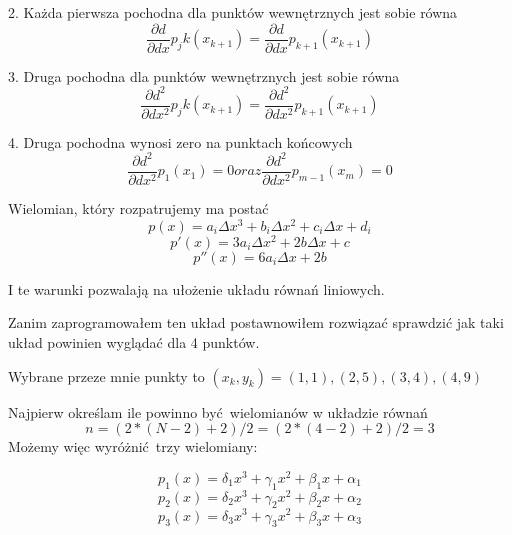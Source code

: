 \documentclass[varwidth,12pt,a4paper]{article}
\begin{document}
2. Każda pierwsza pochodna dla punktów wewnętrznych jest sobie równa
\begin{equation}
     \frac{\partial d}{\partial dx} p_jk (x_{k+1}) = \frac{\partial d}{\partial dx} p_{k+1} (x_{k+1})
\end{equation}

3. Druga pochodna dla punktów wewnętrznych jest sobie równa
\begin{equation}
     \frac{\partial d^2}{\partial dx^2} p_jk (x_{k+1}) = \frac{\partial d^2}{\partial dx^2} p_{k+1} (x_{k+1})
\end{equation}

4. Druga pochodna wynosi zero na punktach końcowych
\begin{equation}
     \frac{\partial d^2}{\partial dx^2} p_1 (x_{1}) = 0 oraz \frac{\partial d^2}{\partial dx^2} p_{m-1} (x_{m}) = 0
\end{equation}

Wielomian, który rozpatrujemy ma postać
\begin{equation}
    p(x) = a_i \Delta x^3 + b_i \Delta x^2 + c_i \Delta x + d_i
\end{equation}
\begin{equation}
    p'(x) = 3 a_i \Delta x^2 + 2b \Delta x + c
\end{equation}
\begin{equation}
    p''(x) = 6 a_i \Delta x + 2b
\end{equation}

I te warunki pozwalają na ułożenie układu równań liniowych.

Zanim zaprogramowałem ten układ postawnowiłem rozwiązać sprawdzić jak taki układ powinien wyglądać dla 4 punktów.

Wybrane przeze mnie punkty to $(x_k, y_k)  = (1,1), (2,5), (3,4), (4, 9) $

Najpierw określam ile powinno być wielomianów w układzie równań 
\begin{equation}
n=(2*(N-2)+2)/2 = (2*(4-2)+2)/2 = 3 
\end{equation}
Możemy więc wyróżnić trzy wielomiany:

\begin{equation}
    p_1(x) = \delta _1 x^3 + \gamma _1 x^2 + \beta _1 x + \alpha _1
\end{equation}
\begin{equation}
    p_2(x) = \delta _2 x^3 + \gamma _2 x^2 + \beta _2 x + \alpha _2
\end{equation}
\begin{equation}
    p_3(x) = \delta _3 x^3 + \gamma _3 x^2 + \beta _3 x + \alpha _3
\end{equation}
\end{document}
